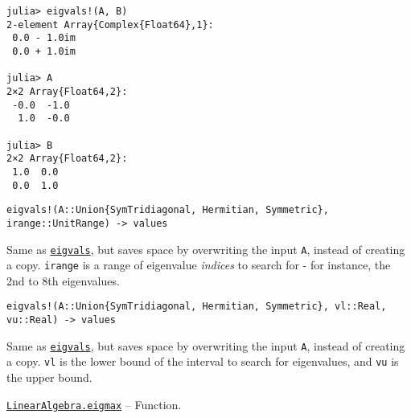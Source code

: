 \begin{adjustwidth}{2em}{0pt}
\begin{verbatim}
julia> eigvals!(A, B)
2-element Array{Complex{Float64},1}:
 0.0 - 1.0im
 0.0 + 1.0im

julia> A
2×2 Array{Float64,2}:
 -0.0  -1.0
  1.0  -0.0

julia> B
2×2 Array{Float64,2}:
 1.0  0.0
 0.0  1.0
\end{verbatim}




\begin{lstlisting}
eigvals!(A::Union{SymTridiagonal, Hermitian, Symmetric}, irange::UnitRange) -> values
\end{lstlisting}

Same as \hyperlink{12334018763942871611}{\texttt{eigvals}}, but saves space by overwriting the input \texttt{A}, instead of creating a copy. \texttt{irange} is a range of eigenvalue \emph{indices} to search for - for instance, the 2nd to 8th eigenvalues.




\begin{lstlisting}
eigvals!(A::Union{SymTridiagonal, Hermitian, Symmetric}, vl::Real, vu::Real) -> values
\end{lstlisting}

Same as \hyperlink{12334018763942871611}{\texttt{eigvals}}, but saves space by overwriting the input \texttt{A}, instead of creating a copy. \texttt{vl} is the lower bound of the interval to search for eigenvalues, and \texttt{vu} is the upper bound.



\end{adjustwidth}
\hypertarget{1568196261511691624}{} 
\hyperlink{1568196261511691624}{\texttt{LinearAlgebra.eigmax}}  -- {Function.}

